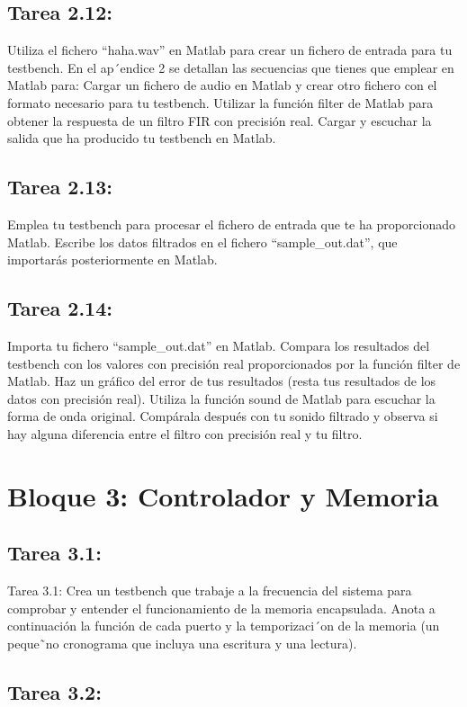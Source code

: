 \documentclass{article}
\begin{document}
\subsection{Tarea 2.12:}

Utiliza el fichero “haha.wav” en Matlab para crear un fichero de entrada para tu testbench. En el ap´endice 2 se detallan las secuencias que tienes que emplear en Matlab para:
Cargar un fichero de audio en Matlab y crear otro fichero con el formato necesario para tu testbench.
Utilizar la función filter de Matlab para obtener la respuesta de un filtro FIR con precisión real.
Cargar y escuchar la salida que ha producido tu testbench en Matlab.

\subsection{Tarea 2.13:}
Emplea tu testbench para procesar el fichero de entrada que te ha proporcionado
Matlab. Escribe los datos filtrados en el fichero “sample{\_}out.dat”, que importarás posteriormente en Matlab.

\subsection{Tarea 2.14:}
Importa tu fichero ``sample{\_}out.dat'' en Matlab. Compara los resultados del testbench con los valores con precisión real proporcionados por la función filter de Matlab. Haz un gráfico del error de tus resultados (resta tus resultados de los datos con precisión real).
Utiliza la función sound de Matlab para escuchar la forma de onda original. Compárala después con tu sonido filtrado y observa si hay alguna diferencia entre el filtro con precisión real y tu filtro.

\section{Bloque 3: Controlador y Memoria}

\subsection{Tarea 3.1:}
Tarea 3.1:
Crea un testbench que trabaje a la frecuencia del sistema para comprobar y entender el funcionamiento de la memoria encapsulada. Anota a continuación la función de cada
puerto y la temporizaci´on de la memoria (un peque˜no cronograma que incluya una escritura y una lectura).

\subsection{Tarea 3.2:}
\end{document}

